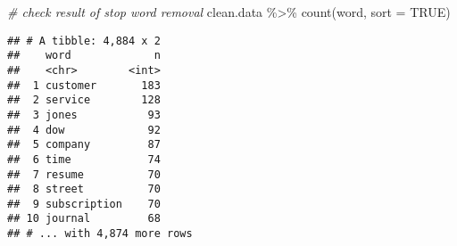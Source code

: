 \documentclass[
]{article}
\newenvironment{Shaded}{\begin{snugshade}}{\end{snugshade}}
\newcommand{\AttributeTok}[1]{\textcolor[rgb]{0.77,0.63,0.00}{#1}}
\newcommand{\CommentTok}[1]{\textcolor[rgb]{0.56,0.35,0.01}{\textit{#1}}}
\newcommand{\ConstantTok}[1]{\textcolor[rgb]{0.00,0.00,0.00}{#1}}
\newcommand{\FunctionTok}[1]{\textcolor[rgb]{0.00,0.00,0.00}{#1}}
\newcommand{\NormalTok}[1]{#1}
\newcommand{\SpecialCharTok}[1]{\textcolor[rgb]{0.00,0.00,0.00}{#1}}
\begin{document}
\begin{Shaded}
\begin{Highlighting}[]
\CommentTok{\# check result of stop word removal}
\NormalTok{clean.data }\SpecialCharTok{\%\textgreater{}\%}
  \FunctionTok{count}\NormalTok{(word, }\AttributeTok{sort =} \ConstantTok{TRUE}\NormalTok{)}
\end{Highlighting}
\end{Shaded}

\begin{verbatim}
## # A tibble: 4,884 x 2
##    word             n
##    <chr>        <int>
##  1 customer       183
##  2 service        128
##  3 jones           93
##  4 dow             92
##  5 company         87
##  6 time            74
##  7 resume          70
##  8 street          70
##  9 subscription    70
## 10 journal         68
## # ... with 4,874 more rows
\end{verbatim}
\end{document}
